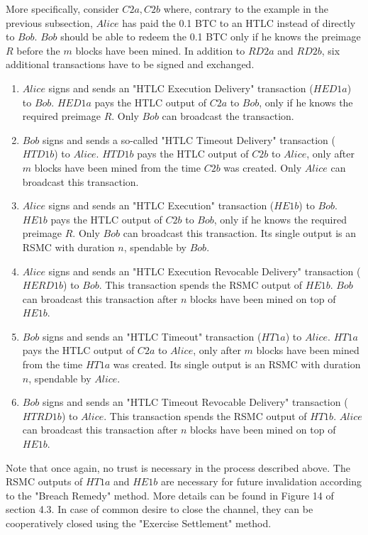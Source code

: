     More specifically, consider $C2a, C2b$ where, contrary to the example in the previous
    subsection, $Alice$ has paid the 0.1 BTC to an HTLC instead of directly to $Bob$.
    $Bob$ should be able to redeem the 0.1 BTC only if he knows the preimage $R$ before
    the $m$ blocks have been mined. In addition to $RD2a$ and $RD2b$, six additional
    transactions have to be signed and exchanged.
    \begin{enumerate}
      \item $Alice$ signs and sends an "HTLC Execution Delivery" transaction ($HED1a$) to
      $Bob$. $HED1a$ pays the HTLC output of $C2a$ to $Bob$, only if he knows the required
      preimage $R$. Only $Bob$ can broadcast the transaction.
      \item $Bob$ signs and sends a so-called "HTLC Timeout Delivery" transaction
      ($HTD1b$) to $Alice$. $HTD1b$ pays the HTLC output of $C2b$ to $Alice$, only after
      $m$ blocks have been mined from the time $C2b$ was created. Only $Alice$ can
      broadcast this transaction.
      \item $Alice$ signs and sends an "HTLC Execution" transaction ($HE1b$) to $Bob$.
      $HE1b$ pays the HTLC output of $C2b$ to $Bob$, only if he knows the required
      preimage $R$. Only $Bob$ can broadcast this transaction. Its single output is an
      RSMC with duration $n$, spendable by $Bob$.
      \item $Alice$ signs and sends an "HTLC Execution Revocable Delivery" transaction
      ($HERD1b$) to $Bob$. This transaction spends the RSMC output of $HE1b$. $Bob$ can
      broadcast this transaction after $n$ blocks have been mined on top of $HE1b$.
      \item $Bob$ signs and sends an "HTLC Timeout" transaction ($HT1a$) to $Alice$.
      $HT1a$ pays the HTLC output of $C2a$ to $Alice$, only after $m$ blocks have been
      mined from the time $HT1a$ was created. Its single output is an RSMC with duration
      $n$, spendable by $Alice$.
      \item $Bob$ signs and sends an "HTLC Timeout Revocable Delivery" transaction
      ($HTRD1b$) to $Alice$. This transaction spends the RSMC output of $HT1b$. $Alice$
      can broadcast this transaction after $n$ blocks have been mined on top of $HE1b$.
    \end{enumerate}
    Note that once again, no trust is necessary in the process described above. The
    RSMC outputs of $HT1a$ and $HE1b$ are necessary for future invalidation according to
    the "Breach Remedy" method. More details can be found in Figure 14 of section 4.3. In
    case of common desire to close the channel, they can be cooperatively closed using the
    "Exercise Settlement" method.

